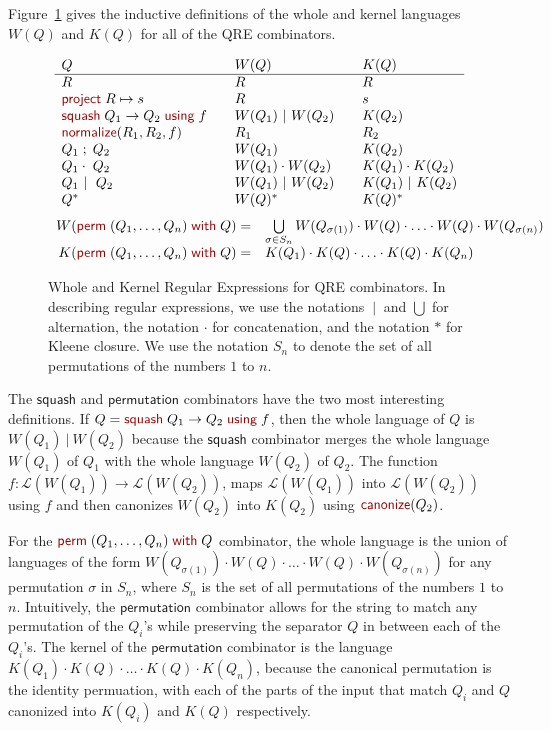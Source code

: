 \documentclass[acmsmall,review,anonymous]{acmart}
\newcommand{\kw}[1]{\textcolor{dkred}{\ensuremath{\mathsf{#1}}}}
\newcommand{\project}[2]{\ensuremath{\kw{project} \; #1 \mapsto #2}}
\newcommand{\squash}[3]{\ensuremath{\kw{squash} \; #1 \rightarrow #2\; \kw{using} \; #3}}
\newcommand{\perm}[2]{\ensuremath{\kw{perm}\; (#1)\; \kw{with}\; #2}}
\newcommand{\normalize}[3]{\ensuremath{\kw{normalize}(#1, #2, #3)}}
\newcommand{\sep}{\ensuremath{\ | \ }}
\newcommand{\canonize}{\ensuremath{\kw{canonize}}}
\begin{document}
Figure~\ref{fig:wk} gives the inductive definitions of the whole and
kernel languages $W(Q)$ and $K(Q)$ for all of the QRE combinators.
\begin{figure}[t]
\centering
\[
\begin{array}{l@{\quad\quad}l@{\quad\quad}l}

Q & W(Q) & K(Q) \\ \hline
R & R & R \\
\project{R}{s} & R & s \\
\squash{Q_1}{Q_2}{f} & W(Q_1) \sep W(Q_2) & K(Q_2) \\
\normalize{R_1}{R_2}{f} & R_1 & R_2 \\
Q_1 \; ; \; Q_2 & W(Q_1) & K(Q_2) \\
Q_1 \cdot\; Q_2 & W(Q_1) \cdot W(Q_2) & K(Q_1) \cdot K(Q_2) \\
Q_1 \sep \; Q_2 & W(Q_1) \sep W(Q_2) & K(Q_1) \sep K(Q_2) \\
Q^* & W(Q)^* & K(Q)^* \\
\end{array}
\]
\[
\begin{array}{r@{\quad}l}
W( \perm{Q_1, \ldots, Q_n}{Q} ) = &
\bigcup \limits_{\sigma \in S_n} W(Q_{\sigma(1)}) \cdot W(Q) \cdot \ldots \cdot
W(Q) \cdot W(Q_{\sigma(n)})\\
K( \perm{Q_1, \ldots, Q_n}{Q} ) = & K(Q_1) \cdot K(Q) \cdot \ldots \cdot K(Q)
\cdot K(Q_n)
\end{array}
\]
\caption{Whole and Kernel Regular Expressions for QRE combinators. 
In describing regular expressions, we use the notations $\sep$ and $\bigcup$ for
alternation, the notation $\cdot$ for concatenation, and the notation
$*$ for Kleene closure.  
We use the notation $S_n$ to denote the set of all permutations of the
numbers $1$ to $n$.
}
\label{fig:wk}
\end{figure}
The \kw{squash} and \kw{permutation} combinators have the two most
interesting definitions. If $Q = \squash{Q_1}{Q_2}{f}$, then the whole language
of $Q$ is $W(Q_1) \sep W(Q_2)$ because the \kw{squash} combinator
merges the whole language $W(Q_1)$ of $Q_1$ with the whole language $W(Q_2)$ of $Q_2$.
The function $f : \mathcal{L}(W(Q_1)) \longrightarrow \mathcal{L}(W(Q_2))$,
maps $\mathcal{L}(W(Q_1))$ into $\mathcal{L}(W(Q_2))$ using $f$ and then
canonizes $W(Q_2)$ into $K(Q_2)$ using $\canonize(Q_2)$.

For the $\perm{Q_1, \ldots, Q_n}{Q}$ combinator, the whole language is the
union of languages of the form $W(Q_{\sigma(1)}) \cdot W(Q) \cdot \ldots \cdot
W(Q) \cdot W(Q_{\sigma(n)})$ for any permutation $\sigma$ in $S_n$, where
$S_n$ is the set of all permutations of the numbers $1$ to $n$. Intuitively,
the \kw{permutation} combinator allows for the string to match any
permutation of the $Q_i$'s while preserving the separator $Q$ in
between each of the $Q_i$'s. The kernel of the \kw{permutation} combinator
is the language $K(Q_1) \cdot K(Q) \cdot \ldots \cdot K(Q) \cdot K(Q_n)$,
because the canonical permutation is the identity permuation, with each of the
parts of the input that match $Q_i$ and $Q$ canonized into $K(Q_i)$ and $K(Q)$
respectively.
\end{document}
